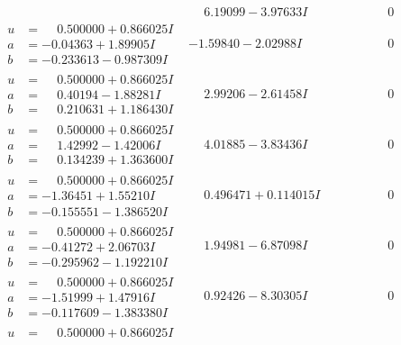 \documentclass[1p]{elsarticle_modified}
\theoremstyle{definition}
\begin{document}
$$\begin{array}{c|c|c}
 & \phantom{-}6.19099 - 3.97633 I & \phantom{-0.000000 } 0 \\ \hline\begin{aligned}
u &= \phantom{-}0.500000 + 0.866025 I \\
a &= -0.04363 + 1.89905 I \\
b &= -0.233613 - 0.987309 I\end{aligned}
 & -1.59840 - 2.02988 I & \phantom{-0.000000 } 0 \\ \hline\begin{aligned}
u &= \phantom{-}0.500000 + 0.866025 I \\
a &= \phantom{-}0.40194 - 1.88281 I \\
b &= \phantom{-}0.210631 + 1.186430 I\end{aligned}
 & \phantom{-}2.99206 - 2.61458 I & \phantom{-0.000000 } 0 \\ \hline\begin{aligned}
u &= \phantom{-}0.500000 + 0.866025 I \\
a &= \phantom{-}1.42992 - 1.42006 I \\
b &= \phantom{-}0.134239 + 1.363600 I\end{aligned}
 & \phantom{-}4.01885 - 3.83436 I & \phantom{-0.000000 } 0 \\ \hline\begin{aligned}
u &= \phantom{-}0.500000 + 0.866025 I \\
a &= -1.36451 + 1.55210 I \\
b &= -0.155551 - 1.386520 I\end{aligned}
 & \phantom{-}0.496471 + 0.114015 I & \phantom{-0.000000 } 0 \\ \hline\begin{aligned}
u &= \phantom{-}0.500000 + 0.866025 I \\
a &= -0.41272 + 2.06703 I \\
b &= -0.295962 - 1.192210 I\end{aligned}
 & \phantom{-}1.94981 - 6.87098 I & \phantom{-0.000000 } 0 \\ \hline\begin{aligned}
u &= \phantom{-}0.500000 + 0.866025 I \\
a &= -1.51999 + 1.47916 I \\
b &= -0.117609 - 1.383380 I\end{aligned}
 & \phantom{-}0.92426 - 8.30305 I & \phantom{-0.000000 } 0 \\ \hline\begin{aligned}
u &= \phantom{-}0.500000 + 0.866025 I \\

\end{aligned}
\end{array}$$
\end{document}
